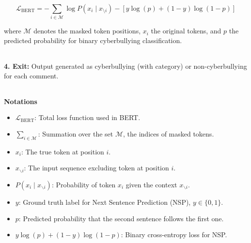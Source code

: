 \[
\mathcal{L}_{\text{BERT}} = - \sum_{i \in \mathcal{M}} \log P(x_i \mid x_{\setminus i}) - \left[ y \log(p) + (1 - y) \log(1 - p) \right]
\]

where \( \mathcal{M} \) denotes the masked token positions, \( x_i \) the original tokens, and \( p \) the predicted probability for binary cyberbullying classification.

\text{ } \\
\textbf{4. Exit:} Output generated as cyberbullying (with category) or non-cyberbullying for each comment.


\text{ } \\
\textbf{Notations}
\begin{itemize}
    \item $\mathcal{L}_{\text{BERT}}$: Total loss function used in BERT.
    \item $\sum_{i \in \mathcal{M}}$: Summation over the set $\mathcal{M}$, the indices of masked tokens.
    \item $x_i$: The true token at position $i$.
    \item $x_{\backslash i}$: The input sequence excluding token at position $i$.
    \item $P(x_i \mid x_{\backslash i})$: Probability of token $x_i$ given the context $x_{\backslash i}$.
    \item $y$: Ground truth label for Next Sentence Prediction (NSP), $y \in \{0, 1\}$.
    \item $p$: Predicted probability that the second sentence follows the first one.
    \item $y \log(p) + (1 - y)\log(1 - p)$: Binary cross-entropy loss for NSP.
\end{itemize}